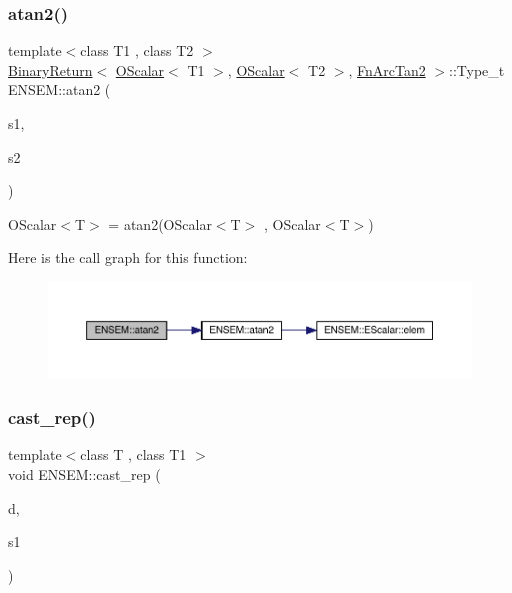 \subsubsection{\texorpdfstring{atan2()}{atan2()}}
{\footnotesize\ttfamily template$<$class T1 , class T2 $>$ \\
\mbox{\hyperlink{structENSEM_1_1BinaryReturn}{Binary\+Return}}$<$ \mbox{\hyperlink{classENSEM_1_1OScalar}{O\+Scalar}}$<$ T1 $>$, \mbox{\hyperlink{classENSEM_1_1OScalar}{O\+Scalar}}$<$ T2 $>$, \mbox{\hyperlink{structENSEM_1_1FnArcTan2}{Fn\+Arc\+Tan2}} $>$\+::Type\+\_\+t E\+N\+S\+E\+M\+::atan2 (\begin{DoxyParamCaption}\item[{const \mbox{\hyperlink{classENSEM_1_1OScalar}{O\+Scalar}}$<$ T1 $>$ \&}]{s1,  }\item[{const \mbox{\hyperlink{classENSEM_1_1OScalar}{O\+Scalar}}$<$ T2 $>$ \&}]{s2 }\end{DoxyParamCaption})\hspace{0.3cm}{\ttfamily [inline]}}



O\+Scalar$<$\+T$>$ = atan2(\+O\+Scalar$<$\+T$>$ , O\+Scalar$<$\+T$>$) 

Here is the call graph for this function\+:\nopagebreak
\begin{figure}[H]
\begin{center}
\leavevmode
\includegraphics[width=350pt]{d1/d71/group__obsscalar_gaa28e2966b2f7ca96382766631b1e7bd1_cgraph}
\end{center}
\end{figure}
\mbox{\label{group__obsscalar_gaf1b78a4937f88c01ae3300374d58d7f2}} 
\subsubsection{\texorpdfstring{cast\_rep()}{cast\_rep()}\hspace{0.1cm}{\footnotesize\ttfamily [1/2]}}
{\footnotesize\ttfamily template$<$class T , class T1 $>$ \\
void E\+N\+S\+E\+M\+::cast\+\_\+rep (\begin{DoxyParamCaption}\item[{T \&}]{d,  }\item[{const \mbox{\hyperlink{classENSEM_1_1OScalar}{O\+Scalar}}$<$ T1 $>$ \&}]{s1 }\end{DoxyParamCaption})\hspace{0.3cm}{\ttfamily [inline]}}



